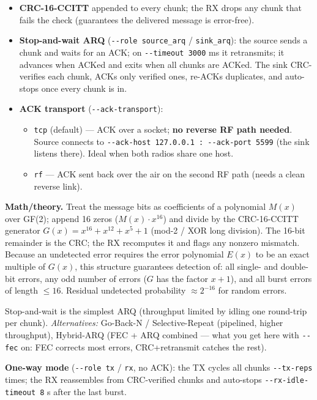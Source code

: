 \documentclass[
  10pt,
]{article}
\providecommand{\tightlist}{%
  \setlength{\itemsep}{0pt}\setlength{\parskip}{0pt}}
\begin{document}
\begin{itemize}
\tightlist
\item
  \textbf{CRC-16-CCITT} appended to every chunk; the RX drops any chunk
  that fails the check (guarantees the delivered message is error-free).
\item
  \textbf{Stop-and-wait ARQ} (\texttt{-\/-role\ source\_arq} /
  \texttt{sink\_arq}): the source sends a chunk and waits for an ACK; on
  \texttt{-\/-timeout\ 3000} ms it retransmits; it advances when ACKed
  and exits when all chunks are ACKed. The sink CRC-verifies each chunk,
  ACKs only verified ones, re-ACKs duplicates, and auto-stops once every
  chunk is in.
\item
  \textbf{ACK transport} (\texttt{-\/-ack-transport}):

  \begin{itemize}
  \tightlist
  \item
    \texttt{tcp} (default) --- ACK over a socket; \textbf{no reverse RF
    path needed}. Source connects to
    \texttt{-\/-ack-host\ 127.0.0.1\ :\ -\/-ack-port\ 5599} (the sink
    listens there). Ideal when both radios share one host.
  \item
    \texttt{rf} --- ACK sent back over the air on the second RF path
    (needs a clean reverse link).
  \end{itemize}
\end{itemize}

\textbf{Math/theory.} Treat the message bits as coefficients of a
polynomial \(M(x)\) over GF(2); append 16 zeros (\(M(x)\cdot x^{16}\))
and divide by the CRC-16-CCITT generator
\(G(x) = x^{16}+x^{12}+x^{5}+1\) (mod-2 / XOR long division). The 16-bit
remainder is the CRC; the RX recomputes it and flags any nonzero
mismatch. Because an undetected error requires the error polynomial
\(E(x)\) to be an exact multiple of \(G(x)\), this structure guarantees
detection of: all single- and double-bit errors, any odd number of
errors (\(G\) has the factor \(x+1\)), and all burst errors of length
\(\le 16\). Residual undetected probability \(\approx 2^{-16}\) for
random errors.

Stop-and-wait is the simplest ARQ (throughput limited by idling one
round-trip per chunk). \emph{Alternatives:} Go-Back-N / Selective-Repeat
(pipelined, higher throughput), Hybrid-ARQ (FEC + ARQ combined --- what
you get here with \texttt{-\/-fec} on: FEC corrects most errors,
CRC+retransmit catches the rest).

\textbf{One-way mode} (\texttt{-\/-role\ tx} / \texttt{rx}, no ACK): the
TX cycles all chunks \texttt{-\/-tx-reps} times; the RX reassembles from
CRC-verified chunks and auto-stops \texttt{-\/-rx-idle-timeout\ 8} s
after the last burst.
\end{document}
